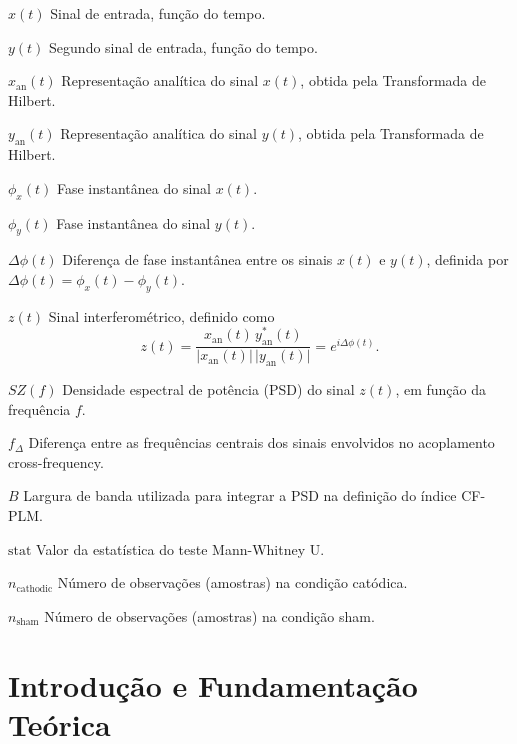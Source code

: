 \documentclass[
  12pt,
  openany,
  twoside,
  a4paper,
  english,
  brazil
]{abntex2}
\begin{document}
\begin{simbolos}
  \item[$x(t)$] Sinal de entrada, função do tempo.
  \item[$y(t)$] Segundo sinal de entrada, função do tempo.
  \item[$x_{\mathrm{an}}(t)$] Representação analítica do sinal \(x(t)\), obtida pela Transformada de Hilbert.
  \item[$y_{\mathrm{an}}(t)$] Representação analítica do sinal \(y(t)\), obtida pela Transformada de Hilbert.
  \item[$\phi_x(t)$] Fase instantânea do sinal \(x(t)\).
  \item[$\phi_y(t)$] Fase instantânea do sinal \(y(t)\).
  \item[$\Delta \phi(t)$] Diferença de fase instantânea entre os sinais \(x(t)\) e \(y(t)\), definida por \(\Delta \phi(t) = \phi_x(t)-\phi_y(t)\).
  \item[$z(t)$] Sinal interferométrico, definido como 
  \[
  z(t)=\frac{x_{\mathrm{an}}(t)\, y_{\mathrm{an}}^*(t)}{\lvert x_{\mathrm{an}}(t)\rvert\, \lvert y_{\mathrm{an}}(t)\rvert} = e^{i\Delta \phi(t)}.
  \]
  \item[$SZ(f)$] Densidade espectral de potência (PSD) do sinal \(z(t)\), em função da frequência \(f\).
  \item[$f_\Delta$] Diferença entre as frequências centrais dos sinais envolvidos no acoplamento cross-frequency.
  \item[$B$] Largura de banda utilizada para integrar a PSD na definição do índice CF-PLM.
  \item[$\text{stat}$] Valor da estatística do teste Mann-Whitney U.
  \item[$n_{\text{cathodic}}$] Número de observações (amostras) na condição catódica.
  \item[$n_{\text{sham}}$] Número de observações (amostras) na condição sham.
\end{simbolos}


\tableofcontents*
\cleardoublepage

\textual
{}
\setcounter{page}{1}

\part{Introdução e Fundamentação Teórica}

\end{document}
